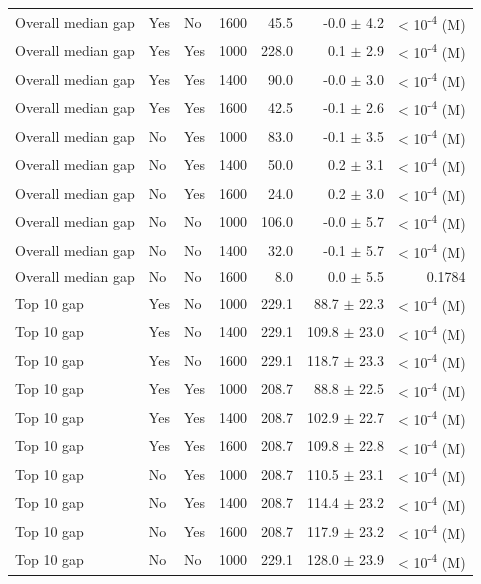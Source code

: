 \documentclass[9pt,twoside,lineno]{pnas-new}
\begin{document}
\begin{table}
\begin{tabular}[t]{llllrrr}
Overall median gap & Yes & No & 1600 & 45.5 & -0.0 $\pm$ 4.2 & < 10\textsuperscript{-4} (M)\\
Overall median gap & Yes & Yes & 1000 & 228.0 & 0.1 $\pm$ 2.9 & < 10\textsuperscript{-4} (M)\\
Overall median gap & Yes & Yes & 1400 & 90.0 & -0.0 $\pm$ 3.0 & < 10\textsuperscript{-4} (M)\\
Overall median gap & Yes & Yes & 1600 & 42.5 & -0.1 $\pm$ 2.6 & < 10\textsuperscript{-4} (M)\\
Overall median gap & No & Yes & 1000 & 83.0 & -0.1 $\pm$ 3.5 & < 10\textsuperscript{-4} (M)\\
Overall median gap & No & Yes & 1400 & 50.0 & 0.2 $\pm$ 3.1 & < 10\textsuperscript{-4} (M)\\
Overall median gap & No & Yes & 1600 & 24.0 & 0.2 $\pm$ 3.0 & < 10\textsuperscript{-4} (M)\\
Overall median gap & No & No & 1000 & 106.0 & -0.0 $\pm$ 5.7 & < 10\textsuperscript{-4} (M)\\
Overall median gap & No & No & 1400 & 32.0 & -0.1 $\pm$ 5.7 & < 10\textsuperscript{-4} (M)\\
Overall median gap & No & No & 1600 & 8.0 & 0.0 $\pm$ 5.5 & 0.1784\\
\addlinespace
Top 10 gap & Yes & No & 1000 & 229.1 & 88.7 $\pm$ 22.3 & < 10\textsuperscript{-4} (M)\\
Top 10 gap & Yes & No & 1400 & 229.1 & 109.8 $\pm$ 23.0 & < 10\textsuperscript{-4} (M)\\
Top 10 gap & Yes & No & 1600 & 229.1 & 118.7 $\pm$ 23.3 & < 10\textsuperscript{-4} (M)\\
Top 10 gap & Yes & Yes & 1000 & 208.7 & 88.8 $\pm$ 22.5 & < 10\textsuperscript{-4} (M)\\
Top 10 gap & Yes & Yes & 1400 & 208.7 & 102.9 $\pm$ 22.7 & < 10\textsuperscript{-4} (M)\\
Top 10 gap & Yes & Yes & 1600 & 208.7 & 109.8 $\pm$ 22.8 & < 10\textsuperscript{-4} (M)\\
Top 10 gap & No & Yes & 1000 & 208.7 & 110.5 $\pm$ 23.1 & < 10\textsuperscript{-4} (M)\\
Top 10 gap & No & Yes & 1400 & 208.7 & 114.4 $\pm$ 23.2 & < 10\textsuperscript{-4} (M)\\
Top 10 gap & No & Yes & 1600 & 208.7 & 117.9 $\pm$ 23.2 & < 10\textsuperscript{-4} (M)\\
Top 10 gap & No & No & 1000 & 229.1 & 128.0 $\pm$ 23.9 & < 10\textsuperscript{-4} (M)\\

\end{tabular}
\end{table}
\end{document}
